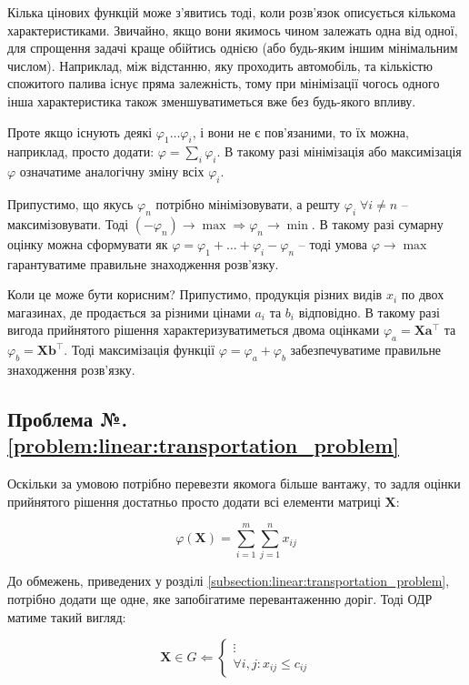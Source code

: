 \documentclass[\main/book.tex]{subfiles}
\begin{document}
Кілька цінових функцій може з'явитись тоді, коли розв'язок описується кількома характеристиками. Звичайно, якщо вони якимось чином залежать одна від одної, для спрощення задачі краще обійтись однією (або будь-яким іншим мінімальним числом). Наприклад, між відстанню, яку проходить автомобіль, та кількістю спожитого палива існує пряма залежність, тому при мінімізації чогось одного інша характеристика також зменшуватиметься вже без будь-якого впливу.

Проте якщо існують деякі $\varphi_1 \ldots \varphi_i$, і вони не є пов'язаними, то їх можна, наприклад, просто додати: $\varphi = \sum_i \varphi_i$. В такому разі мінімізація або максимізація $\varphi$ означатиме аналогічну зміну всіх $\varphi_i$.

Припустимо, що якусь $\varphi_n$ потрібно мінімізовувати, а решту $\varphi_i \; \forall {i \neq n}$ -- максимізовувати. Тоді $(-\varphi_n) \rightarrow \max \Rightarrow \varphi_n \rightarrow \min$. В такому разі сумарну оцінку можна сформувати як $\varphi = \varphi_1 + \ldots + \varphi_i - \varphi_n$ -- тоді умова $\varphi \rightarrow \max$ гарантуватиме правильне знаходження розв'язку.

Коли це може бути корисним? Припустимо, продукція різних видів $x_i$ по двох магазинах, де продається за різними цінами $a_i$ та $b_i$ відповідно. В такому разі \flqq{}вигода\frqq{} прийнятого рішення характеризуватиметься двома оцінками $\varphi_a = \mathbf{X} \mathbf{a}^\top$ та $\varphi_b = \mathbf{X} \mathbf{b}^\top$. Тоді максимізація функції $\varphi = \varphi_a + \varphi_b$ забезпечуватиме правильне знаходження розв'язку.

\subsection*{Проблема №.\ref{problem:linear:transportation_problem}}

Оскільки за умовою потрібно \flqq{}перевезти якомога більше вантажу\frqq{}, то задля оцінки прийнятого рішення достатньо просто додати всі елементи матриці $\mathbf{X}$:

\[
 \varphi(\mathbf{X}) = \sum_{i=1}^{m} \sum_{j=1}^{n} x_{ij}
\]

До обмежень, приведених у розділі \ref{subsection:linear:transportation_problem}, потрібно додати ще одне, яке запобігатиме перевантаженню доріг. Тоді ОДР матиме такий вигляд:

\[
 \mathbf{X} \in G \Leftarrow \left\{
  \begin{array}{l}
   \vdots \\
   \forall i, j: x_{ij} \leq c_{ij}
  \end{array}
 \right.
\]
\end{document}
